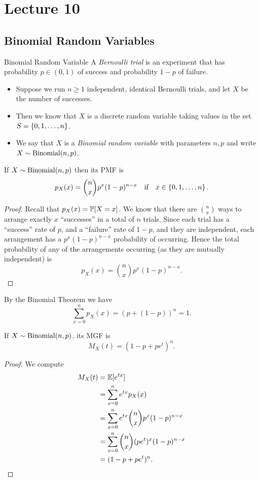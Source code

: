\documentclass[class=article, crop=false]{standalone}
\begin{document}
  \section{Lecture 10}
  \subsection{Binomial Random Variables}
  \begin{definition}{Binomial Random Variable}
    A \emph{Bernoulli trial} is an experiment that has probability $p\in (0, 1)$ of success and probability $1 - p$ of failure.
    \begin{itemize}
      \item Suppose we run $n \geq 1$ independent, identical Bernoulli trials, and let $X$ be the number of successes.
      \item Then we know that $X$ is a discrete random variable taking values in the set $S = \set{0,1,\dotsc,n}$.
      \item We say that $X$ is a \emph{Binomial random variable} with parameters $n, p$ and write $X\sim \Binomial(n, p)$.
    \end{itemize}
  \end{definition}
  \begin{theorem}{}
    If $X\sim \Binomial(n, p)$ then its PMF is
    \[
      p_X(x) = \binom{n}{x}p^x(1 - p)^{n - x}\quad\text{if}\quad x\in \set{0,1,\dotsc,n}.
    \]
    \begin{proof}
      Recall that $p_X(x) = \P[X = x]$. We know that there are $\binom{n}{x}$ ways to arrange exactly $x$ ``successes'' in a total of $n$ trials. Since each trial has a ``success'' rate of $p$, and a ``failure'' rate of $1 - p$, and they are independent, each arrangement has a $p^x(1 - p)^{n - x}$ probability of occurring. Hence the total probability of any of the arrangements occurring (as they are mutually independent) is
      \[
        p_X(x) = \binom{n}{x}p^x(1 - p)^{n - x}.
      \]
    \end{proof}
  \end{theorem}
  \begin{note}{}
    By the Binomial Theorem we have
    \[
      \sum_{x=0}^{n} p_X(x) = (p + (1 - p))^n = 1.
    \]
  \end{note}
  \begin{theorem}{}
    If $X\sim \Binomial(n, p)$, its MGF is
    \[
      M_X(t) = (1 - p + pe^t)^n.
    \]
    \begin{proof}
      We compute
      \begin{align*}
        M_X(t) &= \E[e^{tx}] \\
               &= \sum_{x=0}^{n}e^{tx}p_X(x) \\
               &= \sum_{x=0}^{n}e^{tx}\binom{n}{x}p^x(1 - p)^{n - x} \\
               &= \sum_{x=0}^{n}\binom{n}{x}(pe^t)^x(1 - p)^{n - x} \\
               &= (1 - p + pe^t)^n.
      \end{align*}
    \end{proof}
  \end{theorem}
\end{document}
